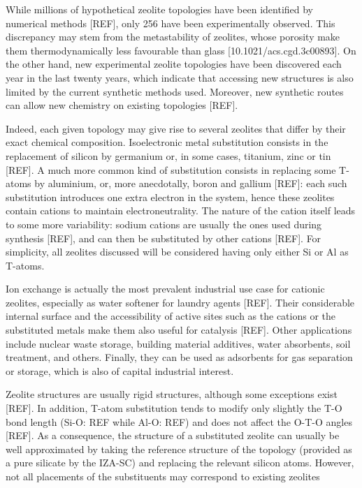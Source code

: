 \documentclass[main.tex]{subfiles}
\begin{document}
While millions of hypothetical zeolite topologies have been identified by numerical methods [REF], only 256 have been experimentally observed. This discrepancy may stem from the metastability of zeolites, whose porosity make them thermodynamically less favourable than glass [10.1021/acs.cgd.3c00893]. On the other hand, new experimental zeolite topologies have been discovered each year in the last twenty years, which indicate that accessing new structures is also limited by the current synthetic methods used. Moreover, new synthetic routes can allow new chemistry on existing topologies [REF].

Indeed, each given topology may give rise to several zeolites that differ by their exact chemical composition. Isoelectronic metal substitution consists in the replacement of silicon by germanium or, in some cases, titanium, zinc or tin [REF]. A much more common kind of substitution consists in replacing some T-atoms by aluminium, or, more anecdotally, boron and gallium [REF]: each such substitution introduces one extra electron in the system, hence these zeolites contain cations to maintain electroneutrality. The nature of the cation itself leads to some more variability: sodium cations are usually the ones used during synthesis [REF], and can then be substituted by other cations [REF]. For simplicity, all zeolites discussed will be considered having only either Si or Al as T-atoms.

Ion exchange is actually the most prevalent industrial use case for cationic zeolites, especially as water softener for laundry agents [REF]. Their considerable internal surface and the accessibility of active sites such as the cations or the substituted metals make them also useful for catalysis [REF]. Other applications include nuclear waste storage, building material additives, water absorbents, soil treatment, and others. Finally, they can be used as adsorbents for gas separation or storage, which is also of capital industrial interest.

Zeolite structures are usually rigid structures, although some exceptions exist [REF]. In addition, T-atom substitution tends to modify only slightly the T-O bond length (Si-O: REF while Al-O: REF) and does not affect the O-T-O angles [REF]. As a consequence, the structure of a substituted zeolite can usually be well approximated by taking the reference structure of the topology (provided as a pure silicate by the IZA-SC) and replacing the relevant silicon atoms. However, not all placements of the substituents may correspond to existing zeolites
\end{document}
